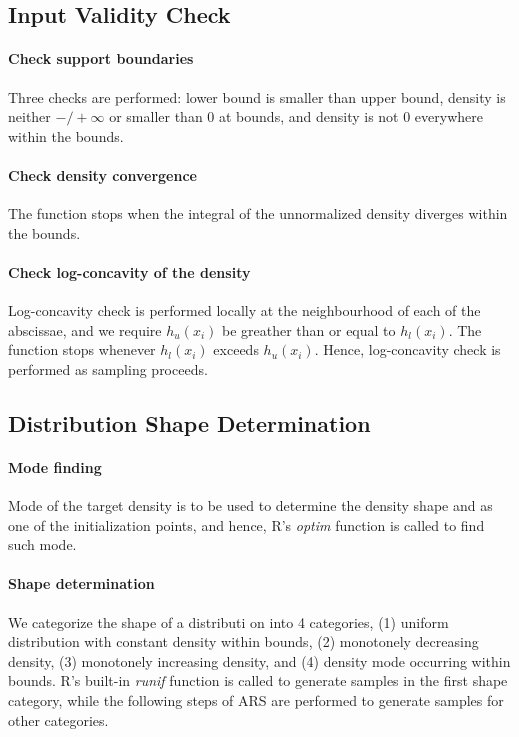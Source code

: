 \documentclass{article}\usepackage[]{graphicx}\usepackage[]{color}
\begin{document}
\subsection{Input Validity Check}
\paragraph{Check support boundaries}
Three checks are performed: lower bound is smaller than upper bound, 
density is neither $-/+ \infty$ or smaller than 0 at bounds, and density is not
0 everywhere within the bounds.
\paragraph{Check density convergence}
The function stops when the integral of the unnormalized density diverges within 
the bounds.
\paragraph{Check log-concavity of the density}
Log-concavity check is performed locally at the neighbourhood of each of the 
abscissae, and we require $h_u(x_i)$ be greather than or equal to $h_l(x_i)$. 
The function stops whenever $h_l(x_i)$ exceeds $h_u(x_i)$. Hence, log-concavity
check is performed as sampling proceeds.

\subsection{Distribution Shape Determination}
\paragraph{Mode finding}
Mode of the target density is to be used to determine the density shape and as
one of the initialization points, and hence, R's \textit{optim} function is called
to find such mode.
\paragraph{Shape determination}
We categorize the shape of a distributi on into 4 categories, (1) uniform distribution
with constant density within bounds, (2) monotonely decreasing density, (3) monotonely
increasing density, and (4) density mode occurring within bounds. R's built-in
\textit{runif} function is called to generate samples in the first shape category, while
the following steps of ARS are performed to generate samples for other categories.
\end{document}
